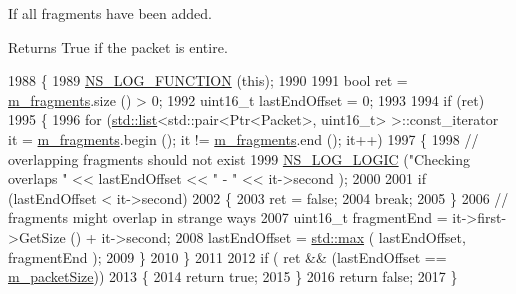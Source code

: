 If all fragments have been added. 

\begin{DoxyReturn}{Returns}
True if the packet is entire. 
\end{DoxyReturn}

\begin{DoxyCode}
1988 \{
1989   \hyperlink{log-macros-disabled_8h_a90b90d5bad1f39cb1b64923ea94c0761}{NS\_LOG\_FUNCTION} (\textcolor{keyword}{this});
1990 
1991   \textcolor{keywordtype}{bool} ret = \hyperlink{classns3_1_1SixLowPanNetDevice_1_1Fragments_aac778380da2b0a760cdf0c31446bf0f9}{m\_fragments}.size () > 0;
1992   uint16\_t lastEndOffset = 0;
1993 
1994   \textcolor{keywordflow}{if} (ret)
1995     \{
1996       \textcolor{keywordflow}{for} (\hyperlink{openflow-interface_8h_afd9bcfa176617760671b67580f536fa7}{std::list}<std::pair<Ptr<Packet>, uint16\_t> >::const\_iterator it = 
      \hyperlink{classns3_1_1SixLowPanNetDevice_1_1Fragments_aac778380da2b0a760cdf0c31446bf0f9}{m\_fragments}.begin (); it != \hyperlink{classns3_1_1SixLowPanNetDevice_1_1Fragments_aac778380da2b0a760cdf0c31446bf0f9}{m\_fragments}.end (); it++)
1997         \{
1998           \textcolor{comment}{// overlapping fragments should not exist}
1999           \hyperlink{group__logging_ga88acd260151caf2db9c0fc84997f45ce}{NS\_LOG\_LOGIC} (\textcolor{stringliteral}{"Checking overlaps "} << lastEndOffset << \textcolor{stringliteral}{" - "} << it->second );
2000 
2001           \textcolor{keywordflow}{if} (lastEndOffset < it->second)
2002             \{
2003               ret = \textcolor{keyword}{false};
2004               \textcolor{keywordflow}{break};
2005             \}
2006           \textcolor{comment}{// fragments might overlap in strange ways}
2007           uint16\_t fragmentEnd = it->first->GetSize () + it->second;
2008           lastEndOffset = \hyperlink{80211b_8c_affe776513b24d84b39af8ab0930fef7f}{std::max} ( lastEndOffset, fragmentEnd );
2009         \}
2010     \}
2011 
2012   \textcolor{keywordflow}{if} ( ret && (lastEndOffset == \hyperlink{classns3_1_1SixLowPanNetDevice_1_1Fragments_a8b00ddf1da93a1b9592c0899e31ea666}{m\_packetSize}))
2013     \{
2014       \textcolor{keywordflow}{return} \textcolor{keyword}{true};
2015     \}
2016   \textcolor{keywordflow}{return} \textcolor{keyword}{false};
2017 \}
\end{DoxyCode}
